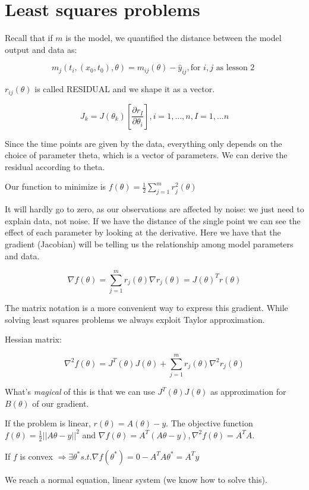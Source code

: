 \hypertarget{least-squares-problems}{%
\section{Least squares problems}\label{least-squares-problems}}

Recall that if $m$ is the model, we quantified the distance between the
model output and data as:

$$
m_j(t_i,(x_0,t_0), \theta) = m_{ij}(\theta) - \hat{y}_{ij}, \text{for } i,j \text{ as lesson 2 } 
$$

$r_{ij}(\theta)$ is called RESIDUAL and we shape it as a vector.

$$
J_k=J(\theta_k)[\frac{\partial r_I}{\partial\theta_i}], i=1, ...,n, I=1,...n
$$

Since the time points are given by the data, everything only depends on
the choice of parameter theta, which is a vector of parameters. We can
derive the residual according to theta.

Our function to minimize is
$f(\theta)=\frac{1}{2}\sum^m_{j=1}r_j^2(\theta)$

It will hardly go to zero, as our observations are affected by noise: we
just need to explain data, not noise. If we have the distance of the
single point we can see the effect of each parameter by looking at the
derivative. Here we have that the gradient (Jacobian) will be telling us
the relationship among model parameters and data.

$$
\nabla f(\theta)=\sum^m_{j=1}r_j(\theta)\nabla r_j(\theta)= J(\theta)^Tr(\theta)
$$

The matrix notation is a more convenient way to express this gradient.
While solving least squares problems we always exploit Taylor
approximation.

Hessian matrix:

$$
\nabla^2 f(\theta)=J^T(\theta)J(\theta)+ \sum^m_{j=1}r_j(\theta) \nabla^2 r_j(\theta)
$$

What's \emph{magical} of this is that we can use $J^T(\theta)J(\theta)$
as approximation for $B(\theta)$ of our gradient.

If the problem is linear, $r(\theta)=A(\theta)-y$. The objective
function $f(\theta)=\frac{1}{2} || A\theta-y||^2$ and
$\nabla f(\theta)=A^T(A\theta-y), \nabla^2 f(\theta)=A^TA$.

If $f$ is convex
$\Rightarrow \exists \theta^* s.t. \nabla f(\theta^*)=0 - A^TA\theta^*=A^Ty$

We reach a normal equation, linear system (we know how to solve this).

